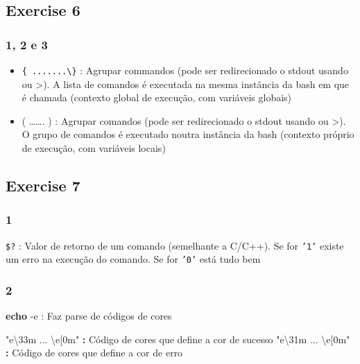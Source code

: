 \documentclass[]{article}
\newenvironment{Shaded}{}{}
\newcommand{\KeywordTok}[1]{\textcolor[rgb]{0.00,0.44,0.13}{\textbf{{#1}}}}
\newcommand{\StringTok}[1]{\textcolor[rgb]{0.25,0.44,0.63}{{#1}}}
\newcommand{\NormalTok}[1]{{#1}}
\begin{document}
\subsection{Exercise 6}\label{exercise-6}

\subsubsection{1, 2 e 3}\label{e-3}

\begin{itemize}
\itemsep1pt\parskip0pt
\item
  \texttt{\{ .......\textbackslash{}\}} : Agrupar commandos (pode ser
  redirecionado o stdout usando \textbar{} ou \textgreater{}). A lista
  de comandos é executada na mesma instância da bash em que é chamada
  (contexto global de execução, com variáveis globais)\\
\item
  ( \ldots{}\ldots{}. ) : Agrupar comandos (pode ser redirecionado o
  stdout usando \textbar{} ou \textgreater{}). O grupo de comandos é
  executado noutra instância da bash (contexto próprio de execução, com
  variáveis locais)\\
\end{itemize}

\subsection{Exercise 7}\label{exercise-7}

\subsubsection{1}\label{section-13}

\texttt{\$?} : Valor de retorno de um comando (semelhante a C/C++). Se
for \texttt{'1'} existe um erro na execução do comando. Se for
\texttt{'0'} está tudo bem

\subsubsection{2}\label{section-14}

\begin{Shaded}
\begin{Highlighting}[]
\KeywordTok{echo} \NormalTok{-e : Faz parse de códigos de cores}

\StringTok{"e\textbackslash{}33m ... \textbackslash{}e[0m"} \KeywordTok{:} \NormalTok{Código de cores que define a cor de sucesso}
\StringTok{"e\textbackslash{}31m ... \textbackslash{}e[0m"} \KeywordTok{:} \NormalTok{Código de cores que define a cor de erro }
\end{Highlighting}
\end{Shaded}
\end{document}
